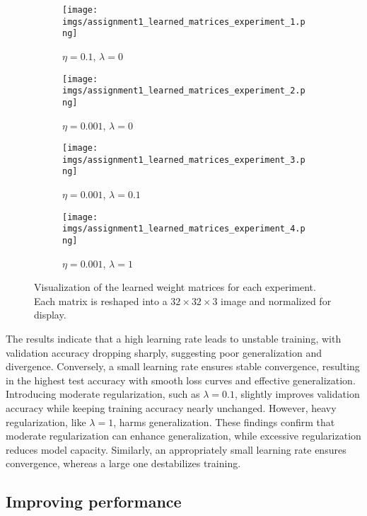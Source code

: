 \documentclass{article}
\begin{document}
\begin{figure}[h!]
    \centering
    \begin{subfigure}{0.45\textwidth}
        \texttt{[image: imgs/assignment1\_learned\_matrices\_experiment\_1.png]}
        \caption{$\eta=0.1$, $\lambda=0$}
        \label{fig:exp_matrix1}
    \end{subfigure}
    \begin{subfigure}{0.45\textwidth}
        \texttt{[image: imgs/assignment1\_learned\_matrices\_experiment\_2.png]}
        \caption{$\eta=0.001$, $\lambda=0$}
        \label{fig:exp_matrix2}
    \end{subfigure}
    \begin{subfigure}{0.45\textwidth}
        \texttt{[image: imgs/assignment1\_learned\_matrices\_experiment\_3.png]}
        \caption{$\eta=0.001$, $\lambda=0.1$}
        \label{fig:exp_matrix3}
    \end{subfigure}
    \begin{subfigure}{0.45\textwidth}
        \texttt{[image: imgs/assignment1\_learned\_matrices\_experiment\_4.png]}
        \caption{$\eta=0.001$, $\lambda=1$}
        \label{fig:exp_matrix4}
    \end{subfigure}
    \caption{Visualization of the learned weight matrices for each experiment. Each matrix is reshaped into a $32 \times 32 \times 3$ image and normalized for display.}
    \label{fig:loss_experiments_matrices}
\end{figure}

The results indicate that a high learning rate leads to unstable training, with validation accuracy dropping sharply, suggesting poor generalization and divergence. Conversely, a small learning rate ensures stable convergence, resulting in the highest test accuracy with smooth loss curves and effective generalization. Introducing moderate regularization, such as $\lambda=0.1$, slightly improves validation accuracy while keeping training accuracy nearly unchanged. However, heavy regularization, like $\lambda=1$, harms generalization. These findings confirm that moderate regularization can enhance generalization, while excessive regularization reduces model capacity. Similarly, an appropriately small learning rate ensures convergence, whereas a large one destabilizes training.


\subsection{Improving performance}
\end{document}
